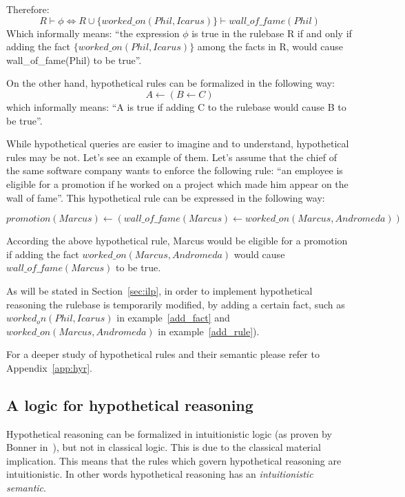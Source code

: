 Therefore:
\begin{equation}
  \label{add_fact}
  R \vdash \phi \iff R \cup \{worked\_on(Phil, Icarus)\} \vdash wall\_of\_fame(Phil)
\end{equation}
Which informally means: ``the expression $\phi$ is true in the rulebase R if and only if
adding the fact $\{worked\_on(Phil, Icarus)\}$ among the facts in R, would cause wall\_of\_fame(Phil)
to be true''.

On the other hand, hypothetical rules can be formalized in the following way:
\begin{equation}
  A \leftarrow (B \leftarrow C)
\end{equation}
which informally means: ``A is true if adding C to the rulebase would cause B to be true''.

While hypothetical queries are easier to imagine and to understand, hypothetical rules may be not. 
Let's see an example of them. Let's assume that the chief of the same software company
wants to enforce the following rule: ``an employee is eligible for a promotion if
he worked on a project which made him appear on the wall of fame''. This
hypothetical rule can be expressed in the following way:

\begin{equation}
  \label{add_rule}
  promotion(Marcus) \leftarrow (wall\_of\_fame(Marcus) \leftarrow worked\_on(Marcus, Andromeda))
\end{equation}

According the above hypothetical rule, Marcus would be eligible for a promotion
if adding the fact $worked\_on(Marcus, Andromeda)$ would cause $wall\_of\_fame(Marcus)$
to be true. 

As will be stated in Section~\ref{sec:ilp}, in order to implement hypothetical reasoning
the rulebase is temporarily modified, by adding a certain fact, such as $worked_on(Phil, Icarus)$ 
in example~\ref{add_fact} and $worked\_on(Marcus, Andromeda)$ in example~\ref{add_rule}).

For a deeper study of hypothetical rules and their semantic please refer to Appendix~\ref{app:hyr}.

\subsection{A logic for hypothetical reasoning}
\label{sec:alfhr}
Hypothetical reasoning can be formalized in intuitionistic logic (as proven by
Bonner in~\cite{Bonner88alogic}), but not in classical logic. This is due to the
classical material implication. This means that the rules which govern hypothetical
reasoning are intuitionistic. In other words hypothetical reasoning has an
\textit{intuitionistic semantic}.

